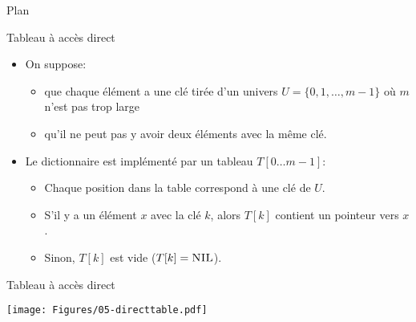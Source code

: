 \begin{frame}{Plan}

\tableofcontents[hideallsubsections]

\end{frame}

\begin{frame}{Tableau à accès direct}

\begin{itemize}
\item On suppose:
\begin{itemize}
\item que chaque élément a une clé tirée d'un univers $U=\{0,1,\ldots,m-1\}$ où $m$ n'est pas trop large
\item qu'il ne peut pas y avoir deux éléments avec la même clé.
\end{itemize}
\item Le dictionnaire est implémenté par un tableau $T[0\ldots m-1]$:
\begin{itemize}
\item Chaque position dans la table correspond à une clé de $U$.
\item S'il y a un élément $x$ avec la clé $k$, alors $T[k]$ contient un pointeur vers $x$.
\item Sinon, $T[k]$ est vide ($T[k]=\textnormal{\scshape NIL}$).
\end{itemize}
\end{itemize}

\end{frame}

\begin{frame}{Tableau à accès direct}

\centerline{\texttt{[image: Figures/05-directtable.pdf]}}

\begin{center}
\begin{small}


\end{small}
\end{center}


\end{frame}

